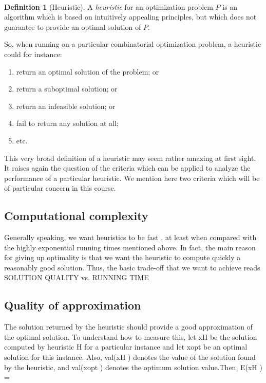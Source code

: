\documentclass[titlepage]{book}
\makeatletter
\newcommand{\concept}[1]{\toindex{#1}\indexlayout{#1}}
\newcommand{\indexlayout}[1]{\emph{#1}}
\newcommand\toindex{\@ifstar{\@dblarg{\@toindexs}}{\@toindex}}
\def\@toindexs[#1]#2{\index{#1@#2}}
\newcommand\@toindex[2][]{%
  \if\relax\detokenize{#1}\relax
    \begingroup
    \@splitword#2\@nil%
    \uppercase\expandafter{%
      \expandafter\def\expandafter\@initial\expandafter{\@first}}%
    \toks0=\expandafter{\@initial}%
    \toks2=\expandafter{\@rest}%
    \edef\x{\endgroup\noexpand\index{\the\toks0 \the\toks2 }}\x
  \else
    \index{#1}
  \fi
}
\def\@splitword#1#2\@nil{\def\@first{#1}\def\@rest{#2}}
\theoremstyle{plain}
\theoremstyle{definition}
\newtheorem{definition}[theorem]{Definition}
\theoremstyle{remark}
\makeatother
\begin{document}
\paragraph{}
\begin{definition}[Heuristic]
A \concept{heuristic} for an optimization problem $P$ is an algorithm which is based on intuitively appealing principles, but which does not guarantee to provide an optimal solution of $P$.
\end{definition}

So, when running on a particular combinatorial optimization problem, a heuristic could for instance:
\begin{enumerate}
 \item return an optimal solution of the problem; or
 \item return a suboptimal solution; or
 \item return an infeasible solution; or
 \item fail to return any solution at all;
 \item etc.
\end{enumerate}
This very broad definition of a heuristic may seem rather amazing at first sight. It raises again the question of the criteria which can be applied to analyze the performance of a particular heuristic. We mention here two criteria which will be of particular concern in this course.

\subsection{Computational complexity}

Generally speaking, we want heuristics to be fast , at least when compared with the highly exponential
running times mentioned above. In fact, the main reason for giving up optimality is that we want the
heuristic to compute quickly a reasonably good solution. Thus, the basic trade-off that we want to achieve
reads
SOLUTION QUALITY vs. RUNNING TIME

\subsection{Quality of approximation}

The solution returned by the heuristic should provide a good approximation of the optimal solution. To
understand how to measure this, let xH be the solution computed by heuristic H for a particular instance
and let xopt be an optimal solution for this instance. Also, val(xH ) denotes the value of the solution
found by the heuristic, and val(xopt ) denotes the optimum solution value.Then,
E(xH ) =
\end{document}
